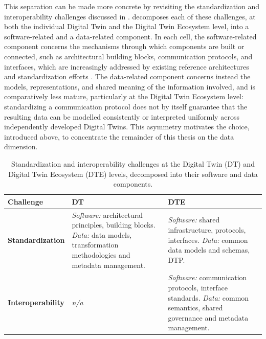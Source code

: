 This separation can be made more concrete by revisiting the standardization and interoperability challenges discussed in .  decomposes each of these challenges, at both the individual Digital Twin and the Digital Twin Ecosystem level, into a software-related and a data-related component. In each cell, the software-related component concerns the mechanisms through which components are built or connected, such as architectural building blocks, communication protocols, and interfaces, which are increasingly addressed by existing reference architectures and standardization efforts \cite{wang2022standards}. The data-related component concerns instead the models, representations, and shared meaning of the information involved, and is comparatively less mature, particularly at the Digital Twin Ecosystem level: standardizing a communication protocol does not by itself guarantee that the resulting data can be modelled consistently or interpreted uniformly across independently developed Digital Twins. This asymmetry motivates the choice, introduced above, to concentrate the remainder of this thesis on the data dimension.

\begin{table}[htbp]
\centering
\caption{Standardization and interoperability challenges at the Digital Twin (DT) and Digital Twin Ecosystem (DTE) levels, decomposed into their software and data components.}
\label{tab:standardization_interoperability}
\renewcommand{\arraystretch}{1.5} %
\begin{tabular}{p{3.2cm} p{5.5cm} p{5.5cm}}
\toprule
\textbf{Challenge} & \textbf{DT} & \textbf{DTE} \\
\midrule
\textbf{Standardization} 
& 
\textit{Software:} architectural principles, building blocks. \newline
\textit{Data:} data models, transformation methodologies and metadata management.
& 
\textit{Software:} shared infrastructure, protocols, interfaces. \newline
\textit{Data:} common data models and schemas, DTP.
\\
\addlinespace
\textbf{Interoperability} 
& 
\textit{n/a}
& 
\textit{Software:} communication protocols, interface standards. \newline
\textit{Data:} common semantics, shared governance and metadata management.
\\
\bottomrule
\end{tabular}
\end{table}

